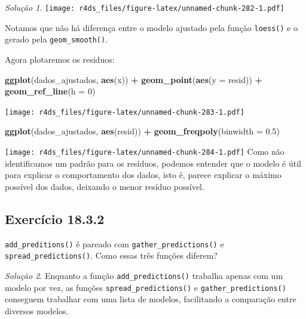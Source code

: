 \documentclass[
]{latex/krantz}
\newenvironment{Shaded}{\begin{snugshade}}{\end{snugshade}}
\newcommand{\AttributeTok}[1]{\textcolor[rgb]{0.13,0.29,0.53}{#1}}
\newcommand{\DecValTok}[1]{\textcolor[rgb]{0.00,0.00,0.81}{#1}}
\newcommand{\FloatTok}[1]{\textcolor[rgb]{0.00,0.00,0.81}{#1}}
\newcommand{\FunctionTok}[1]{\textcolor[rgb]{0.13,0.29,0.53}{\textbf{#1}}}
\newcommand{\NormalTok}[1]{#1}
\newcommand{\SpecialCharTok}[1]{\textcolor[rgb]{0.81,0.36,0.00}{\textbf{#1}}}
\theoremstyle{definition}
\theoremstyle{definition}
\theoremstyle{definition}
\theoremstyle{definition}
\theoremstyle{remark}
\newtheorem*{solution}{Solução}
\begin{document}
\begin{solution}
\texttt{[image: r4ds\_files/figure-latex/unnamed-chunk-282-1.pdf]}

Notamos que não há diferença entre o modelo ajustado pela função \texttt{loess()} e o gerado pela \texttt{geom\_smooth()}.

Agora plotaremos os residuos:

\begin{Shaded}
\begin{Highlighting}[]
\FunctionTok{ggplot}\NormalTok{(dados\_ajustados, }\FunctionTok{aes}\NormalTok{(x)) }\SpecialCharTok{+}
  \FunctionTok{geom\_point}\NormalTok{(}\FunctionTok{aes}\NormalTok{(}\AttributeTok{y =}\NormalTok{ resid)) }\SpecialCharTok{+}
  \FunctionTok{geom\_ref\_line}\NormalTok{(}\AttributeTok{h =} \DecValTok{0}\NormalTok{)}
\end{Highlighting}
\end{Shaded}

\texttt{[image: r4ds\_files/figure-latex/unnamed-chunk-283-1.pdf]}

\begin{Shaded}
\begin{Highlighting}[]
\FunctionTok{ggplot}\NormalTok{(dados\_ajustados, }\FunctionTok{aes}\NormalTok{(resid)) }\SpecialCharTok{+}
  \FunctionTok{geom\_freqpoly}\NormalTok{(}\AttributeTok{binwidth =} \FloatTok{0.5}\NormalTok{)}
\end{Highlighting}
\end{Shaded}

\texttt{[image: r4ds\_files/figure-latex/unnamed-chunk-284-1.pdf]}
Como não identificamos um padrão para os resíduos, podemos entender que o modelo é útil para explicar o comportamento dos dados, isto é, parece explicar o máximo possível dos dados, deixando o menor resíduo possível.
\end{solution}

\hypertarget{exr18-3-2}{%
\subsection*{Exercício 18.3.2}\label{exr18-3-2}}

\texttt{add\_preditions()} é pareado com \texttt{gather\_predictions()} e \texttt{spread\_predictions()}. Como essas três funções diferem?

\begin{solution}
Enquanto a função \texttt{add\_predictions()} trabalha apenas com um modelo por vez, as funções \texttt{spread\_predictions()} e \texttt{gather\_predictions()} conseguem trabalhar com uma lista de modelos, facilitando a comparação entre diversos modelos.
\end{solution}
\end{document}
